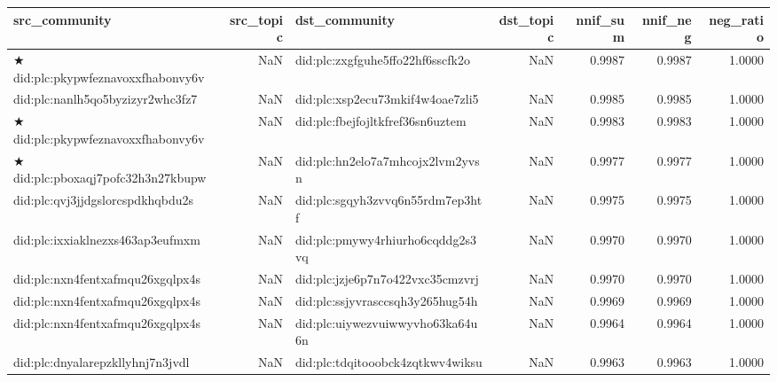 \begin{tabular}{lrlrrrr}
\toprule
src_community & src_topic & dst_community & dst_topic & nnif_sum & nnif_neg & neg_ratio \\
\midrule
★ did:plc:pkypwfeznavoxxfhabonvy6v & NaN & did:plc:zxgfguhe5ffo22hf6sscfk2o & NaN & 0.9987 & 0.9987 & 1.0000 \\
did:plc:nanlh5qo5byzizyr2whc3fz7 & NaN & did:plc:xsp2ecu73mkif4w4oae7zli5 & NaN & 0.9985 & 0.9985 & 1.0000 \\
★ did:plc:pkypwfeznavoxxfhabonvy6v & NaN & did:plc:fbejfojltkfref36sn6uztem & NaN & 0.9983 & 0.9983 & 1.0000 \\
★ did:plc:pboxaqj7pofc32h3n27kbupw & NaN & did:plc:hn2elo7a7mhcojx2lvm2yvsn & NaN & 0.9977 & 0.9977 & 1.0000 \\
did:plc:qvj3jjdgslorcspdkhqbdu2s & NaN & did:plc:sgqyh3zvvq6n55rdm7ep3htf & NaN & 0.9975 & 0.9975 & 1.0000 \\
did:plc:ixxiaklnezxs463ap3eufmxm & NaN & did:plc:pmywy4rhiurho6cqddg2s3vq & NaN & 0.9970 & 0.9970 & 1.0000 \\
did:plc:nxn4fentxafmqu26xgqlpx4s & NaN & did:plc:jzje6p7n7o422vxc35cmzvrj & NaN & 0.9970 & 0.9970 & 1.0000 \\
did:plc:nxn4fentxafmqu26xgqlpx4s & NaN & did:plc:ssjyvrasccsqh3y265hug54h & NaN & 0.9969 & 0.9969 & 1.0000 \\
did:plc:nxn4fentxafmqu26xgqlpx4s & NaN & did:plc:uiywezvuiwwyvho63ka64u6n & NaN & 0.9964 & 0.9964 & 1.0000 \\
did:plc:dnyalarepzkllyhnj7n3jvdl & NaN & did:plc:tdqitooobck4zqtkwv4wiksu & NaN & 0.9963 & 0.9963 & 1.0000 \\
\bottomrule
\end{tabular}
